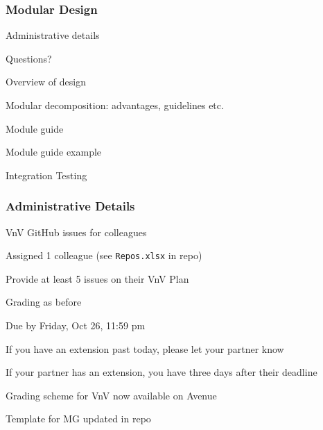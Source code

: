 \documentclass[t,12pt,numbers,fleqn]{beamer}
\begin{document}



\begin{frame}
\frametitle{Modular Design}

\bi
\item Administrative details
\item Questions?
\item Overview of design
\item Modular decomposition: advantages, guidelines etc.
\item Module guide
\item Module guide example
\item Integration Testing 
\ei
\end{frame}


\begin{frame}
\frametitle{Administrative Details}

\bi
\item VnV GitHub issues for colleagues
\bi
\item Assigned 1 colleague (see \texttt{Repos.xlsx} in repo)
\item Provide at least 5 issues on their VnV Plan
\item Grading as before
\item Due by Friday, Oct 26, 11:59 pm
\item If you have an extension past today, please let your partner know
\item If your partner has an extension, you have three days after their deadline
\ei

\item Grading scheme for VnV now available on Avenue
\item Template for MG updated in repo
\ei

\end{frame}

\end{document}
